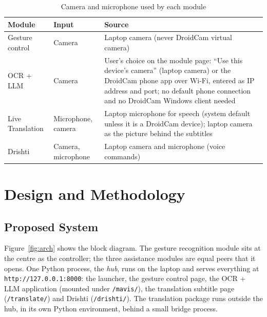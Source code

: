 \documentclass[12pt,singleside,a4paper]{article}
\begin{document}
\begin{table}[H]
\centering
\caption{Camera and microphone used by each module}
\label{tab:devices}
\small
\begin{tabularx}{\textwidth}{@{}p{3.2cm}p{3.6cm}X@{}}
\toprule
\textbf{Module} & \textbf{Input} & \textbf{Source} \\
\midrule
Gesture control & Camera & Laptop camera (never DroidCam virtual camera) \\
OCR + LLM & Camera & User's choice on the module page: ``Use this device's camera'' (laptop camera) or the DroidCam phone app over Wi-Fi, entered as IP address and port; no default phone connection and no DroidCam Windows client needed \\
Live Translation & Microphone, camera & Laptop microphone for speech (system default unless it is a DroidCam device); laptop camera as the picture behind the subtitles \\
Drishti & Camera, microphone & Laptop camera and microphone (voice commands) \\
\bottomrule
\end{tabularx}
\end{table}
\section{Design and Methodology}
\subsection{Proposed System}
Figure~\ref{fig:arch} shows the block diagram. The gesture recognition module sits at the centre as the controller; the three assistance modules are equal peers that it opens. One Python process, the \emph{hub}, runs on the laptop and serves everything at \texttt{http://127.0.0.1:8000}: the launcher, the gesture control page, the OCR + LLM application (mounted under \texttt{/mavis/}), the translation subtitle page (\texttt{/translate/}) and Drishti (\texttt{/drishti/}). The translation package runs outside the hub, in its own Python environment, behind a small bridge process.
\end{document}
